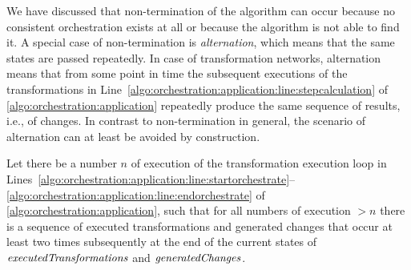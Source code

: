 We have discussed that non-termination of the algorithm can occur because no consistent orchestration exists at all or because the algorithm is not able to find it.
A special case of non-termination is \emph{alternation}, which means that the same states are passed repeatedly. 
In case of transformation networks, alternation means that from some point in time the subsequent executions of the transformations in Line~\ref{algo:orchestration:application:line:stepcalculation} of \autoref{algo:orchestration:application} repeatedly produce the same sequence of results, i.e., of changes.
In contrast to non-termination in general, the scenario of alternation can at least be avoided by construction.

\begin{definition}
    \label{def:applyalternation}
    Let there be a number $n$ of execution of the transformation execution loop in Lines~\autoref{algo:orchestration:application:line:startorchestrate}--\autoref{algo:orchestration:application:line:endorchestrate} of \autoref{algo:orchestration:application}, such that for all numbers of execution $> n$ there is a sequence of executed transformations and generated changes that occur at least two times subsequently at the end of the current states of $\mathit{executedTransformations}$ and $\mathit{generatedChanges}$.
\end{definition}

